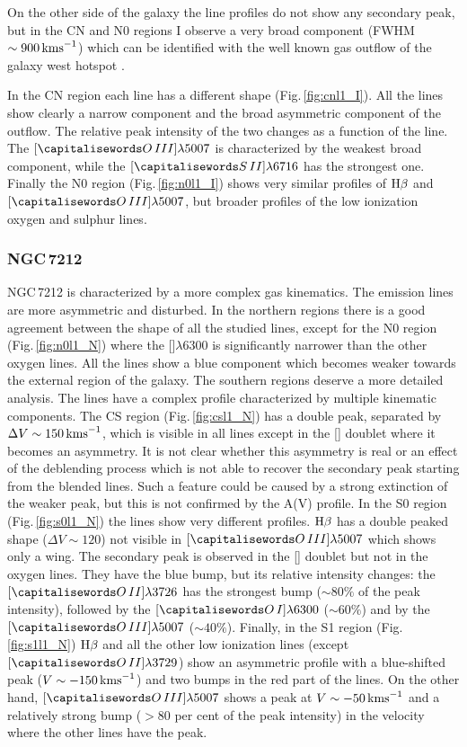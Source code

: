 \documentclass[../thesis.tex]{subfiles}
\begin{document}
On the other side of the galaxy the line profiles do not show any secondary peak, but in the CN and N0 regions I observe a very broad component (FWHM$\sim 900\,\si{\kms}$) which can be identified with the well known gas outflow of the galaxy west hotspot \citep[e.g.][]{Morganti07,Morganti15,Dasyra15}.

In the CN region each line has a different shape (Fig.\,\ref{fig:cnl1_I}).
All the lines show clearly a narrow component and the broad asymmetric component of the outflow.
The relative peak intensity of the two changes as a function of the line.
The $[\ion{O}{III}]\lambda5007$ is characterized by the weakest broad component, while the $[\ion{S}{II}]\lambda6716$ has the strongest one.
Finally the N0 region (Fig.\,\ref{fig:n0l1_I}) shows very similar profiles of $\Hb$ and $[\ion{O}{III}]\lambda5007$, but broader profiles of the low ionization oxygen and sulphur lines.


\subsubsection{NGC\,7212}
NGC\,7212 is characterized by a more complex gas kinematics.
The emission lines are more asymmetric and disturbed.
In the northern regions there is a good agreement between the shape of all the studied lines, except for the N0 region (Fig.\,\ref{fig:n0l1_N}) where the []$\lambda6300$ is significantly narrower than the other oxygen lines.
All the lines show a blue component which becomes weaker towards the external region of the galaxy.
The southern regions deserve a more detailed analysis.
The lines have a complex profile characterized by multiple kinematic components.
The CS region (Fig.\,\ref{fig:csl1_N}) has a double peak, separated by $\Delta V\sim 150\,\si{\kms}$, which is visible in all lines except in the [] doublet where it becomes an asymmetry.
It is not clear whether this asymmetry is real or an effect of the deblending process which is not able to recover the secondary peak starting from the blended lines.
Such a feature could be caused by a strong extinction of the weaker peak, but this is not confirmed by the A(V) profile.
In the S0 region (Fig.\,\ref{fig:s0l1_N}) the lines show very different profiles.
$\Hb$ has a double peaked shape ($\Delta V\sim 120$) not visible in $[\ion{O}{III}]\lambda5007$ which shows only a wing.
The secondary peak is observed in the [] doublet but not in the oxygen lines.
They have the blue bump, but its relative intensity changes: the $[\ion{O}{II}]\lambda3726$ has the strongest bump ($\sim80\%$ of the peak intensity), followed by the $[\ion{O}{I}]\lambda6300$ ($\sim60\%$) and by the $[\ion{O}{III}]\lambda5007$ ($\sim40\%$).
Finally, in the S1 region (Fig.\,\ref{fig:s1l1_N}) $\Hb$ and all the other low ionization lines (except $[\ion{O}{II}]\lambda3729$) show an asymmetric profile with a blue-shifted peak ($V\sim-150\,\si{\kms}$) and two bumps in the red part of the lines.
On the other hand, $[\ion{O}{III}]\lambda5007$ shows a peak at $V\sim -50\,\si{\kms}$ and a relatively strong bump ($>80$ per cent of the peak intensity) in the velocity where the other lines have the peak.
\end{document}
